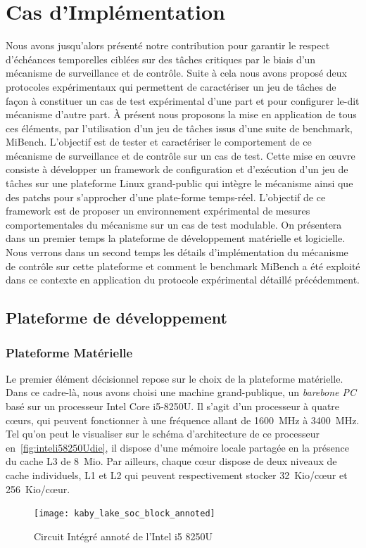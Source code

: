 \documentclass[french, a4paper, 11pt, twoside, pdftex]{StyleThese}
\begin{document}
\setcounter{chapter}{5} %
\dominitoc
\faketableofcontents
\fi

\chapter{Cas d'Implémentation} \label{chap:5_ImplementationCase}
\minitoc

Nous avons jusqu'alors présenté notre contribution pour garantir le respect d'échéances temporelles ciblées sur des tâches critiques par le biais d'un mécanisme de surveillance et de contrôle. Suite à cela nous avons proposé deux protocoles expérimentaux qui permettent de caractériser un jeu de tâches de façon à constituer un cas de test expérimental d'une part et pour configurer le-dit mécanisme d'autre part. À présent nous proposons la mise en application de tous ces éléments, par l'utilisation d'un jeu de tâches issus d'une suite de benchmark, MiBench. L'objectif est de tester et caractériser le comportement de ce mécanisme de surveillance et de contrôle sur un cas de test. Cette mise en œuvre consiste à développer un framework de configuration et d'exécution d'un jeu de tâches sur une plateforme Linux grand-public qui intègre le mécanisme ainsi que des patchs pour s'approcher d'une plate-forme temps-réel. L'objectif de ce framework est de proposer un environnement expérimental de mesures comportementales du mécanisme sur un cas de test modulable. On présentera dans un premier temps la plateforme de développement matérielle et logicielle. Nous verrons dans un second temps les détails d'implémentation du mécanisme de contrôle sur cette plateforme et comment le benchmark MiBench a été exploité dans ce contexte en application du protocole expérimental détaillé précédemment.


\section{Plateforme de développement}
    
        \subsection{Plateforme Matérielle}
        	Le premier élément décisionnel repose sur le choix de la plateforme matérielle. Dans ce cadre-là, nous avons choisi une machine grand-publique, un \textit{barebone PC} basé sur un processeur Intel Core i5-8250U. Il s'agit d'un processeur à quatre cœurs, qui peuvent fonctionner à une fréquence allant de 1600~MHz à 3400~MHz. Tel qu'on peut le visualiser sur le schéma d'architecture de ce processeur en~\autoref{fig:inteli58250Udie}, il dispose d'une mémoire locale partagée en la présence du cache L3 de 8~Mio. Par ailleurs, chaque cœur dispose de deux niveaux de cache individuels, L1 et L2 qui peuvent respectivement stocker 32~Kio/cœur et 256~Kio/cœur. 
       	\begin{figure}[ht!]
       		\centering
       		\texttt{[image: kaby\_lake\_soc\_block\_annoted]} %
       		\caption{Circuit Intégré annoté de l'Intel i5 8250U}
       		\label{fig:inteli58250Udie}
       	\end{figure}
       
\end{document}
